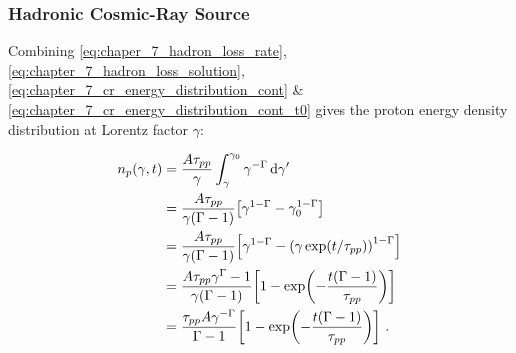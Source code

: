 \subsubsection{Hadronic Cosmic-Ray Source}

Combining \autoref{eq:chaper_7_hadron_loss_rate}, \autoref{eq:chapter_7_hadron_loss_solution}, \autoref{eq:chapter_7_cr_energy_distribution_cont} \& \autoref{eq:chapter_7_cr_energy_distribution_cont_t0} gives the proton energy density distribution at Lorentz factor $\gamma$:

\begin{equation}
    \begin{aligned}
    n_p\qty(\gamma,t)&=\frac{A\tau_{pp}}{\gamma}\int_\gamma^{\gamma_0} \gamma^{-\Gamma} \dd{\gamma'} \\
	&=\frac{A\tau_{pp}}{\gamma(\Gamma-1)}\qty[\gamma^{1-\Gamma}-\gamma_0^{1-\Gamma}] \\
	&=\frac{A\tau_{pp}}{\gamma(\Gamma-1)}\qty[\gamma^{1-\Gamma}-\qty(\gamma\exp(t/\tau_{pp}))^{1-\Gamma}] \\
	&=\frac{A\tau_{pp}\gamma^{\Gamma}-1}{\gamma(\Gamma-1)}\qty[1-\exp(-\frac{t\qty(\Gamma-1)}{\tau_{pp}})] \\
	&=\frac{\tau_{pp}A\gamma^{-\Gamma}}{\Gamma-1}\qty[1-\exp(-\frac{t\qty(\Gamma-1)}{\tau_{pp}})] \text{ .}
    \end{aligned} \label{eq:chapter_7_cont_hadronic_cr_energy_distrib}
\end{equation}

